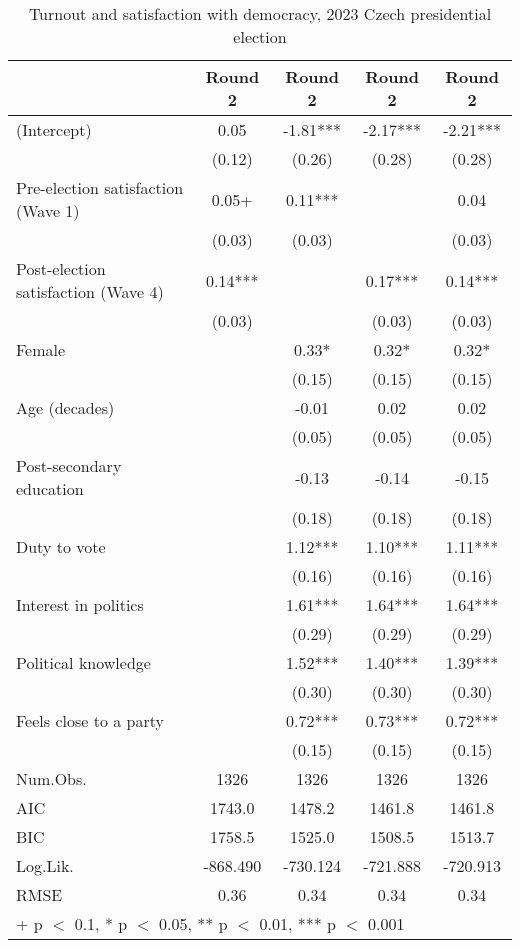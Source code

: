 \begin{table}

\caption{\label{tab:unnamed-chunk-4}Turnout and satisfaction with democracy, 2023 Czech presidential election}
\centering
\begin{tabular}[t]{lcccc}
\toprule
  & Round 2 & Round 2  & Round 2   & Round 2   \\
\midrule
(Intercept) & 0.05 & -1.81*** & -2.17*** & -2.21***\\
 & (0.12) & (0.26) & (0.28) & (0.28)\\
Pre-election satisfaction (Wave 1) & 0.05+ & 0.11*** &  & 0.04\\
 & (0.03) & (0.03) &  & (0.03)\\
Post-election satisfaction (Wave 4) & 0.14*** &  & 0.17*** & 0.14***\\
 & (0.03) &  & (0.03) & (0.03)\\
Female &  & 0.33* & 0.32* & 0.32*\\
 &  & (0.15) & (0.15) & \vphantom{1} (0.15)\\
Age (decades) &  & -0.01 & 0.02 & 0.02\\
 &  & (0.05) & (0.05) & (0.05)\\
Post-secondary education &  & -0.13 & -0.14 & -0.15\\
 &  & (0.18) & (0.18) & (0.18)\\
Duty to vote &  & 1.12*** & 1.10*** & 1.11***\\
 &  & (0.16) & (0.16) & (0.16)\\
Interest in politics &  & 1.61*** & 1.64*** & 1.64***\\
 &  & (0.29) & (0.29) & (0.29)\\
Political knowledge &  & 1.52*** & 1.40*** & 1.39***\\
 &  & (0.30) & (0.30) & (0.30)\\
Feels close to a party &  & 0.72*** & 0.73*** & 0.72***\\
 &  & (0.15) & (0.15) & (0.15)\\
\midrule
Num.Obs. & 1326 & 1326 & 1326 & 1326\\
AIC & 1743.0 & 1478.2 & 1461.8 & 1461.8\\
BIC & 1758.5 & 1525.0 & 1508.5 & 1513.7\\
Log.Lik. & -868.490 & -730.124 & -721.888 & -720.913\\
RMSE & 0.36 & 0.34 & 0.34 & 0.34\\
\bottomrule
\multicolumn{5}{l}{\rule{0pt}{1em}+ p $<$ 0.1, * p $<$ 0.05, ** p $<$ 0.01, *** p $<$ 0.001}\\
\end{tabular}
\end{table}
